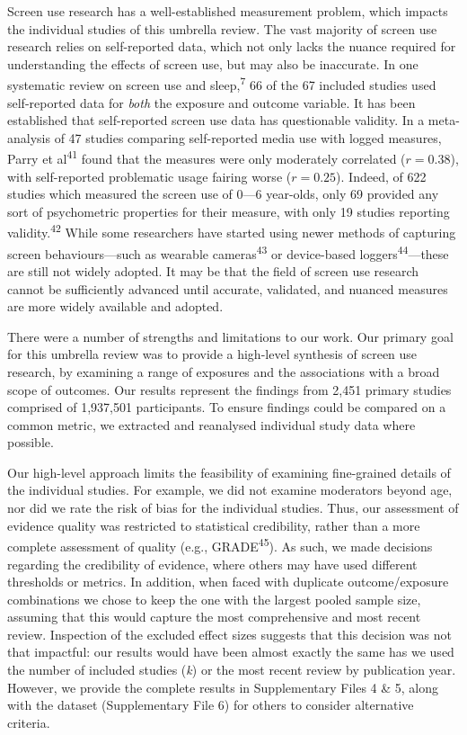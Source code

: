 \documentclass[
  english,
  man]{apa6}
\begin{document}
Screen use research has a well-established measurement problem, which impacts the individual studies of this umbrella review.
The vast majority of screen use research relies on self-reported data, which not only lacks the nuance required for understanding the effects of screen use, but may also be inaccurate.
In one systematic review on screen use and sleep,\textsuperscript{7} 66 of the 67 included studies used self-reported data for \emph{both} the exposure and outcome variable.
It has been established that self-reported screen use data has questionable validity.
In a meta-analysis of 47 studies comparing self-reported media use with logged measures, Parry et al\textsuperscript{41} found that the measures were only moderately correlated (\(r = 0.38\)), with self-reported problematic usage fairing worse (\(r = 0.25\)).
Indeed, of 622 studies which measured the screen use of 0---6 year-olds, only 69 provided any sort of psychometric properties for their measure, with only 19 studies reporting validity.\textsuperscript{42}
While some researchers have started using newer methods of capturing screen behaviours---such as wearable cameras\textsuperscript{43} or device-based loggers\textsuperscript{44}---these are still not widely adopted.
It may be that the field of screen use research cannot be sufficiently advanced until accurate, validated, and nuanced measures are more widely available and adopted.

There were a number of strengths and limitations to our work.
Our primary goal for this umbrella review was to provide a high-level synthesis of screen use research, by examining a range of exposures and the associations with a broad scope of outcomes.
Our results represent the findings from 2,451 primary studies comprised of 1,937,501 participants.
To ensure findings could be compared on a common metric, we extracted and reanalysed individual study data where possible.

Our high-level approach limits the feasibility of examining fine-grained details of the individual studies.
For example, we did not examine moderators beyond age, nor did we rate the risk of bias for the individual studies.
Thus, our assessment of evidence quality was restricted to statistical credibility, rather than a more complete assessment of quality (e.g., GRADE\textsuperscript{45}).
As such, we made decisions regarding the credibility of evidence, where others may have used different thresholds or metrics.
In addition, when faced with duplicate outcome/exposure combinations we chose to keep the one with the largest pooled sample size, assuming that this would capture the most comprehensive and most recent review.
Inspection of the excluded effect sizes suggests that this decision was not that impactful: our results would have been almost exactly the same has we used the number of included studies (\emph{k}) or the most recent review by publication year.
However, we provide the complete results in Supplementary Files 4 \& 5, along with the dataset (Supplementary File 6) for others to consider alternative criteria.
\end{document}
